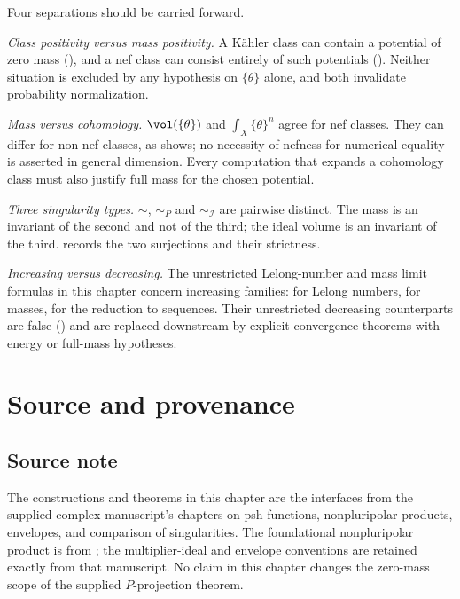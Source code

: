 Four separations should be carried forward.

\emph{Class positivity versus mass positivity.}  A K\"ahler class can
contain a potential of zero mass (), and a nef
class can consist entirely of such potentials
().  Neither situation is excluded by any
hypothesis on $\{\theta\}$ alone, and both invalidate probability
normalization.

\emph{Mass versus cohomology.}  $\vol(\{\theta\})$ and
$\int_X\{\theta\}^n$ agree for nef classes.  They can differ for
non-nef classes, as  shows; no necessity
of nefness for numerical equality is asserted in general dimension.
Every computation that expands a
cohomology class must also justify full mass for the chosen potential.

\emph{Three singularity types.}  $\sim$, $\sim_P$ and
$\sim_{\mathcal I}$ are pairwise distinct.  The mass is an invariant of
the second and not of the third; the ideal volume is an invariant of the
third.   records the two surjections and
 their strictness.

\emph{Increasing versus decreasing.}  The unrestricted Lelong-number and mass limit formulas in this
chapter concern increasing families:  for
Lelong numbers,  for masses,
 for the reduction to sequences.  Their unrestricted decreasing
counterparts are false
() and are
replaced downstream by explicit convergence theorems with energy or
full-mass hypotheses.

\section{Source and provenance}
\label{sec:ch51-source}

\subsection{Source note}
\label{sec:ch51-source-note}

\begin{remark}
\label{rem:complex-prerequisites-source}
The constructions and theorems in this chapter are the interfaces from
the supplied complex manuscript's chapters on psh functions,
nonpluripolar products, envelopes, and comparison of singularities.
The foundational nonpluripolar product is from \cite{BEGZ10};
the multiplier-ideal and envelope conventions are retained exactly from
that manuscript.  No claim in this chapter changes the zero-mass scope
of the supplied $P$-projection theorem.
\end{remark}

